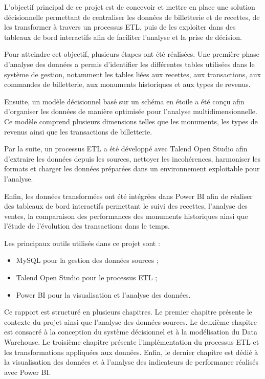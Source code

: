 \documentclass[12pt,a4paper]{report}
\begin{document}
L’objectif principal de ce projet est de concevoir et mettre en place une solution décisionnelle permettant de centraliser les données de billetterie et de recettes, de les transformer à travers un processus ETL, puis de les exploiter dans des tableaux de bord interactifs afin de faciliter l’analyse et la prise de décision.

Pour atteindre cet objectif, plusieurs étapes ont été réalisées. Une première phase d’analyse des données a permis d’identifier les différentes tables utilisées dans le système de gestion, notamment les tables liées aux recettes, aux transactions, aux commandes de billetterie, aux monuments historiques et aux types de revenus.

Ensuite, un modèle décisionnel basé sur un schéma en étoile a été conçu afin d’organiser les données de manière optimisée pour l’analyse multidimensionnelle. Ce modèle comprend plusieurs dimensions telles que les monuments, les types de revenus ainsi que les transactions de billetterie.

Par la suite, un processus ETL a été développé avec Talend Open Studio afin d’extraire les données depuis les sources, nettoyer les incohérences, harmoniser les formats et charger les données préparées dans un environnement exploitable pour l’analyse.

Enfin, les données transformées ont été intégrées dans Power BI afin de réaliser des tableaux de bord interactifs permettant le suivi des recettes, l’analyse des ventes, la comparaison des performances des monuments historiques ainsi que l’étude de l’évolution des transactions dans le temps.

Les principaux outils utilisés dans ce projet sont :

\begin{itemize}
	\item MySQL pour la gestion des données sources ;
	\item Talend Open Studio pour le processus ETL ;
	\item Power BI pour la visualisation et l’analyse des données.
\end{itemize}

Ce rapport est structuré en plusieurs chapitres. Le premier chapitre présente le contexte du projet ainsi que l’analyse des données sources. Le deuxième chapitre est consacré à la conception du système décisionnel et à la modélisation du Data Warehouse. Le troisième chapitre présente l’implémentation du processus ETL et les transformations appliquées aux données. Enfin, le dernier chapitre est dédié à la visualisation des données et à l’analyse des indicateurs de performance réalisés avec Power BI.
\end{document}

